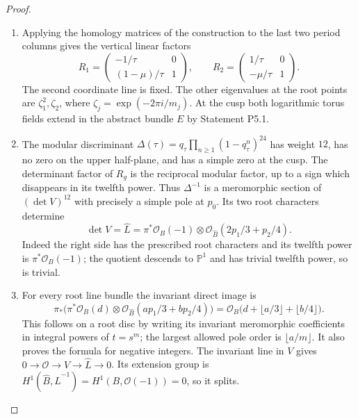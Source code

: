 \begin{proof}
\begin{enumerate}[label=\arabic*.,leftmargin=*]
\item Applying the homology matrices of the construction to the last two
period columns gives the vertical linear factors
\[
 R_1=\begin{pmatrix}-1/\tau&0\\(1-\mu)/\tau&1\end{pmatrix},\qquad
 R_2=\begin{pmatrix}1/\tau&0\\-\mu/\tau&1\end{pmatrix}.
\]
The second coordinate line is fixed.  The other eigenvalues at the root
points are $\zeta_1^2,\zeta_2$, where
$\zeta_j=\exp(-2\pi i/m_j)$.  At the cusp both logarithmic torus fields
extend in the abstract bundle $E$ by Statement P5.1.

\item The modular discriminant
$\Delta(\tau)=q_\tau\prod_{n\geq1}(1-q_\tau^n)^{24}$ has weight $12$,
has no zero on the upper half-plane, and has a simple zero at the cusp.
The determinant factor of $R_g$ is the reciprocal modular factor, up to
a sign which disappears in its twelfth power.  Thus $\Delta^{-1}$ is a
meromorphic section of $(\det V)^{12}$ with precisely a simple pole at
$p_0$.  Its two root characters determine
\begin{equation}\label{eq:P5L}
 \det V=\widehat L
 =\pi^*\mathcal O_B(-1)\otimes
   \mathcal O_{\widehat B}(2p_1/3+p_2/4).
\end{equation}
Indeed the right side has the prescribed root characters and its
twelfth power is $\pi^*\mathcal O_B(-1)$; the quotient descends to
$\mathbb P^1$ and has trivial twelfth power, so is trivial.

\item For every root line bundle the invariant direct image is
\begin{equation}\label{eq:P5floor}
 \pi_*\bigl(\pi^*\mathcal O_B(d)\otimes
 \mathcal O_{\widehat B}(ap_1/3+bp_2/4)\bigr)
 =\mathcal O_B\bigl(d+\lfloor a/3\rfloor+\lfloor b/4\rfloor\bigr).
\end{equation}
This follows on a root disc by writing its invariant meromorphic
coefficients in integral powers of $t=s^m$; the largest allowed pole
order is $\lfloor a/m\rfloor$.  It also proves the formula for negative
integers.  The invariant line in $V$ gives
$0\to\mathcal O\to V\to\widehat L\to0$.  Its extension group is
$H^1(\widehat B,\widehat L^{-1})=H^1(B,\mathcal O(-1))=0$, so it splits.


\end{enumerate}
\end{proof}
